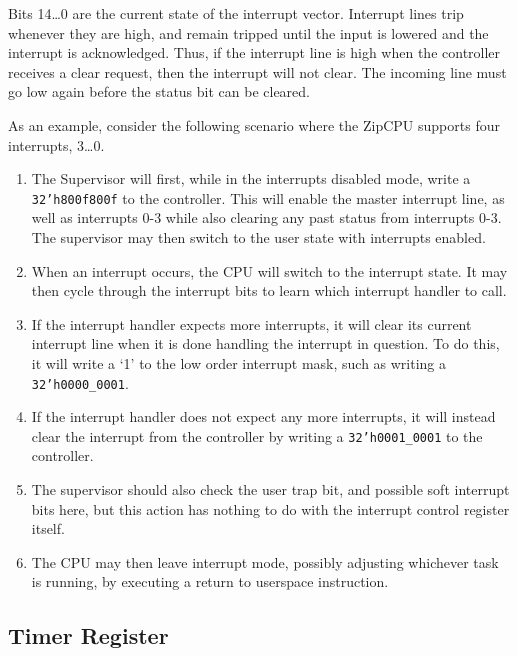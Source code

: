 \documentclass{gqtekspec}
\begin{document}
Bits 14\ldots 0 are the current state of the interrupt vector.  Interrupt lines
trip whenever they are high, and remain tripped until the input is lowered and
the interrupt is acknowledged.  Thus, if the interrupt line is high when the
controller receives a clear request, then the interrupt will not clear.
The incoming line must go low again before the status bit can be cleared.

As an example, consider the following scenario where the ZipCPU supports four
interrupts, 3\ldots0.
\begin{enumerate}
\item The Supervisor will first, while in the interrupts disabled mode,
	write a {\tt 32'h800f800f} to the controller.  This will enable the
	master interrupt line, as well as interrupts 0-3 while also clearing any
	past status from interrupts 0-3.  The supervisor may then
	switch to the user state with interrupts enabled.
\item When an interrupt occurs, the CPU will switch to the interrupt
	state.  It may then cycle through the interrupt bits to learn which
	interrupt handler to call.
\item If the interrupt handler expects more interrupts, it will clear its
	current interrupt line when it is done handling the interrupt in
	question.  To do this, it will write a `1' to the low order interrupt
	mask, such as writing a {\tt 32'h0000\_0001}.
\item If the interrupt handler does not expect any more interrupts, it will
	instead clear the interrupt from the controller by writing a 
	{\tt 32'h0001\_0001} to the controller.
\item The supervisor should also check the user trap bit, and possible soft
	interrupt bits here, but this action has nothing to do with the
	interrupt control register itself.
\item The CPU may then leave interrupt mode, possibly adjusting
	whichever task is running, by executing a return to userspace
	instruction.
\end{enumerate}
\subsection{Timer Register}\label{sec:reg-timer}
\end{document}
